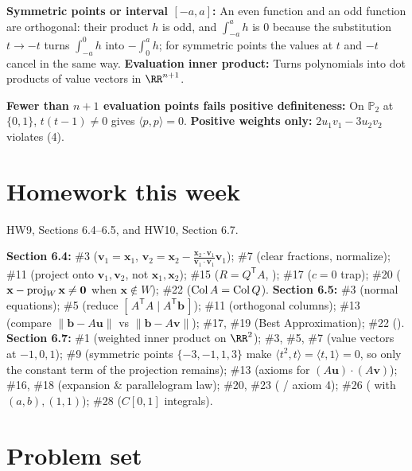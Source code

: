 \documentclass[10pt]{scrartcl}
\newcommand{\vv}[1]{\mathbf{#1}}
\newcommand{\ip}[2]{\langle #1,#2\rangle}
\begin{document}
\begin{shortcuts}
  \ii \textbf{Symmetric points or interval $[-a,a]$:} An even function and an odd function are orthogonal: their product $h$ is odd, and $\int_{-a}^ah$ is $0$ because the substitution $t\to-t$ turns $\int_{-a}^0h$ into $-\int_0^ah$; for symmetric points the values at $t$ and $-t$ cancel in the same way.
  \ii \textbf{Evaluation inner product:} Turns polynomials into dot products of value vectors in $\RR^{n+1}$.
\end{shortcuts}

\begin{trapbox}
  \ii \textbf{Fewer than $n+1$ evaluation points fails positive definiteness:} On $\mathbb P_2$ at $\{0,1\}$, $t(t-1)\neq0$ gives $\ip{p}{p}=0$.
  \ii \textbf{Positive weights only:} $2u_1v_1-3u_2v_2$ violates (4).
\end{trapbox}

\section{Homework this week}
HW9, Sections 6.4--6.5, and HW10, Section 6.7.
\begin{itemize}
  \ii \textbf{Section 6.4:} \#3 ($\vv v_1=\vv x_1$, $\vv v_2=\vv x_2-\frac{\vv x_2\cdot\vv v_1}{\vv v_1\cdot\vv v_1}\vv v_1$); \#7 (clear fractions, normalize); \#11 (project onto $\vv v_1,\vv v_2$, not $\vv x_1,\vv x_2$); \#15 ($R=Q^{\mathsf T}A$, ); \#17 ($c=0$ trap); \#20 ($\vv x-\proj_W\vv x\neq\vv 0$ when $\vv x\notin W$); \#22 ($\operatorname{Col} A=\operatorname{Col} Q$).
  \ii \textbf{Section 6.5:} \#3 (normal equations); \#5 (reduce $[\,A^{\mathsf T}A\mid A^{\mathsf T}\vv b\,]$); \#11 (orthogonal columns); \#13 (compare $\|\vv b-A\vv u\|$ vs $\|\vv b-A\vv v\|$); \#17, \#19 (Best Approximation); \#22 ().
  \ii \textbf{Section 6.7:} \#1 (weighted inner product on $\RR^2$); \#3, \#5, \#7 (value vectors at $-1,0,1$); \#9 (symmetric points $\{-3,-1,1,3\}$ make $\ip{t^2}{t}=\ip{t}{1}=0$, so only the constant term of the projection remains); \#13 (axioms for $(A\vv u)\cdot(A\vv v)$); \#16, \#18 (expansion \& parallelogram law); \#20, \#23 ( / axiom 4); \#26 ( with $(a,b),(1,1)$); \#28 ($C[0,1]$ integrals).
\end{itemize}

\section{Problem set}
\end{document}
